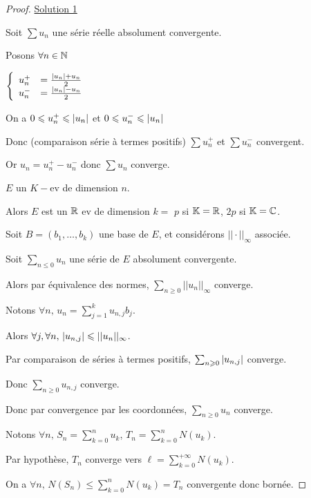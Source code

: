 \begin{proof} 
    \uline{Solution 1 }

    \svspace Soit $\sum u_n$ une série réelle absolument convergente.

    Posons $\forall n \in \mathbb{N}$

    $\left\{ \begin{array}{rl}
        u_n^+ & = \frac{\left|u_n\right| + u_n}{ 2} \\
        u_n^- & = \frac{\left|u_n\right| - u_n}{ 2}
    \end{array} \right.$

    On a $0 \leqslant u_n^+ \leqslant \left|u_n\right|$ et $0 \leqslant u_n^- \leqslant \left|u_n\right|$

    Donc (comparaison série à termes positifs) $\sum u_n^+$ et $\sum u_n^-$ convergent. 

    Or $u_n = u_n^+ - u_n^-$ donc $\sum u_n$ converge.

     $E$ un $K-$ev de dimension $n$. 
    
    Alors $E$ est un $\mathbb{R}$ ev de dimension $k = $ $p$ si $\mathbb{K} = \mathbb{R}$, $2p$ si $\mathbb{K} = \mathbb{C}$.

    Soit $B = (b_1, \ldots, b_k)$ une base de $E$, et considérons $|| \cdot ||_\infty$ associée. 

    Soit $\sum_{n \leqslant 0} u_n$ une série de $E$ absolument convergente.

    Alors par équivalence des normes, $\sum_{n \geqslant 0} || u_n ||_\infty$ converge.

    Notons $\displaystyle \forall n, \, u_n = \sum_{j = 1}^k u_{n, j} b_j$.

    Alors $\forall j, \forall n, \, \left|u_{n, j}\right| \leqslant || u_n ||_\infty$.

    Par comparaison de séries à termes positifs, $\sum_{n \geqslant 0} \left|u_{n, j}\right|$ converge.

    Donc $\sum_{n \geqslant 0} u_{n, j}$ converge. 

    Donc par convergence par les coordonnées, $\sum_{n \geqslant 0} u_n$ converge.



    Notons $\displaystyle \forall n, \, S_n = \sum_{k = 0}^{n } u_k $, $\displaystyle T_n = \sum_{k = 0 }^{n } N(u_k)$.

    Par hypothèse, $T_n$ converge vers $\displaystyle \ell = \sum_{k = 0}^{+\infty} N(u_k)$.

    On a $\forall n, \, N(S_n) \leqslant \sum_{k = 0 }^{n } N(u_k) = T_n$ convergente donc bornée. 


\end{proof}
